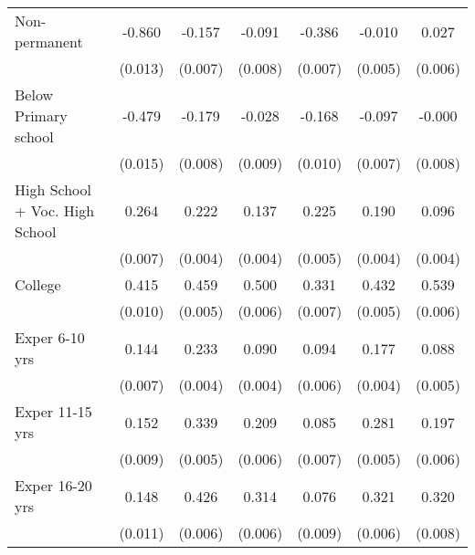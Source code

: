 \begin{table}[htbp]
\begin{tabular}{l*{6}{c}}
Non-permanent       &      -0.860\sym{***}&      -0.157\sym{***}&      -0.091\sym{***}&      -0.386\sym{***}&      -0.010         &       0.027\sym{***}\\
                    &     (0.013)         &     (0.007)         &     (0.008)         &     (0.007)         &     (0.005)         &     (0.006)         \\
Below Primary school&      -0.479\sym{***}&      -0.179\sym{***}&      -0.028\sym{**} &      -0.168\sym{***}&      -0.097\sym{***}&      -0.000         \\
                    &     (0.015)         &     (0.008)         &     (0.009)         &     (0.010)         &     (0.007)         &     (0.008)         \\
High School + Voc. High School&       0.264\sym{***}&       0.222\sym{***}&       0.137\sym{***}&       0.225\sym{***}&       0.190\sym{***}&       0.096\sym{***}\\
                    &     (0.007)         &     (0.004)         &     (0.004)         &     (0.005)         &     (0.004)         &     (0.004)         \\
College             &       0.415\sym{***}&       0.459\sym{***}&       0.500\sym{***}&       0.331\sym{***}&       0.432\sym{***}&       0.539\sym{***}\\
                    &     (0.010)         &     (0.005)         &     (0.006)         &     (0.007)         &     (0.005)         &     (0.006)         \\
Exper 6-10 yrs      &       0.144\sym{***}&       0.233\sym{***}&       0.090\sym{***}&       0.094\sym{***}&       0.177\sym{***}&       0.088\sym{***}\\
                    &     (0.007)         &     (0.004)         &     (0.004)         &     (0.006)         &     (0.004)         &     (0.005)         \\
Exper 11-15 yrs     &       0.152\sym{***}&       0.339\sym{***}&       0.209\sym{***}&       0.085\sym{***}&       0.281\sym{***}&       0.197\sym{***}\\
                    &     (0.009)         &     (0.005)         &     (0.006)         &     (0.007)         &     (0.005)         &     (0.006)         \\
Exper 16-20 yrs     &       0.148\sym{***}&       0.426\sym{***}&       0.314\sym{***}&       0.076\sym{***}&       0.321\sym{***}&       0.320\sym{***}\\
                    &     (0.011)         &     (0.006)         &     (0.006)         &     (0.009)         &     (0.006)         &     (0.008)         \\

\end{tabular}
\end{table}
